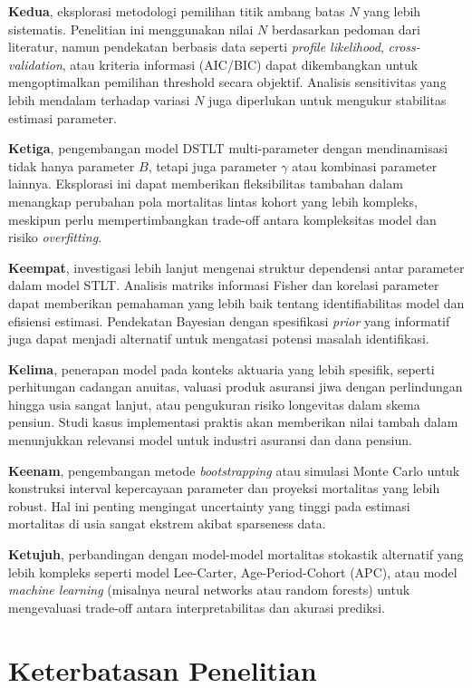 \textbf{Kedua}, eksplorasi metodologi pemilihan titik ambang batas $N$ yang lebih sistematis. Penelitian ini menggunakan nilai $N$ berdasarkan pedoman dari literatur, namun pendekatan berbasis data seperti \textit{profile likelihood}, \textit{cross-validation}, atau kriteria informasi (AIC/BIC) dapat dikembangkan untuk mengoptimalkan pemilihan threshold secara objektif. Analisis sensitivitas yang lebih mendalam terhadap variasi $N$ juga diperlukan untuk mengukur stabilitas estimasi parameter.

\textbf{Ketiga}, pengembangan model DSTLT multi-parameter dengan mendinamisasi tidak hanya parameter $B$, tetapi juga parameter $\gamma$ atau kombinasi parameter lainnya. Eksplorasi ini dapat memberikan fleksibilitas tambahan dalam menangkap perubahan pola mortalitas lintas kohort yang lebih kompleks, meskipun perlu mempertimbangkan trade-off antara kompleksitas model dan risiko \textit{overfitting}.

\textbf{Keempat}, investigasi lebih lanjut mengenai struktur dependensi antar parameter dalam model STLT. Analisis matriks informasi Fisher dan korelasi parameter dapat memberikan pemahaman yang lebih baik tentang identifiabilitas model dan efisiensi estimasi. Pendekatan Bayesian dengan spesifikasi \textit{prior} yang informatif juga dapat menjadi alternatif untuk mengatasi potensi masalah identifikasi.

\textbf{Kelima}, penerapan model pada konteks aktuaria yang lebih spesifik, seperti perhitungan cadangan anuitas, valuasi produk asuransi jiwa dengan perlindungan hingga usia sangat lanjut, atau pengukuran risiko longevitas dalam skema pensiun. Studi kasus implementasi praktis akan memberikan nilai tambah dalam menunjukkan relevansi model untuk industri asuransi dan dana pensiun.

\textbf{Keenam}, pengembangan metode \textit{bootstrapping} atau simulasi Monte Carlo untuk konstruksi interval kepercayaan parameter dan proyeksi mortalitas yang lebih robust. Hal ini penting mengingat uncertainty yang tinggi pada estimasi mortalitas di usia sangat ekstrem akibat sparseness data.

\textbf{Ketujuh}, perbandingan dengan model-model mortalitas stokastik alternatif yang lebih kompleks seperti model Lee-Carter, Age-Period-Cohort (APC), atau model \textit{machine learning} (misalnya neural networks atau random forests) untuk mengevaluasi trade-off antara interpretabilitas dan akurasi prediksi.

\section{Keterbatasan Penelitian}


